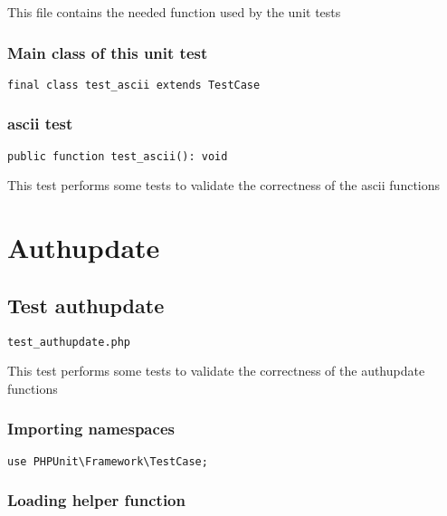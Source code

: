 \documentclass[a4paper]{article}
\begin{document}
This file contains the needed function used by the unit tests

\hypertarget{toc48}{}
\subsubsection{Main class of this unit test}

\begin{lstlisting}
final class test_ascii extends TestCase
\end{lstlisting}

\hypertarget{toc49}{}
\subsubsection{ascii test}

\begin{lstlisting}
public function test_ascii(): void
\end{lstlisting}

This test performs some tests to validate the correctness
of the ascii functions


\hypertarget{toc50}{}
\section{Authupdate}

\hypertarget{toc51}{}
\subsection{Test authupdate}

\begin{lstlisting}
test_authupdate.php
\end{lstlisting}

This test performs some tests to validate the correctness
of the authupdate functions

\hypertarget{toc52}{}
\subsubsection{Importing namespaces}

\begin{lstlisting}
use PHPUnit\Framework\TestCase;
\end{lstlisting}

\hypertarget{toc53}{}
\subsubsection{Loading helper function}
\end{document}
